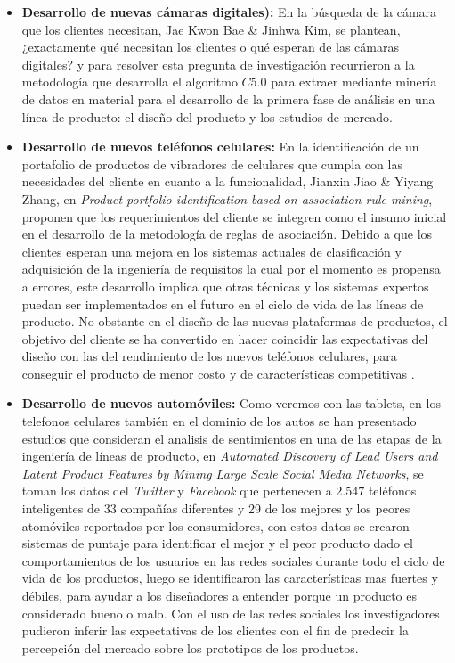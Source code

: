 \begin{itemize}
	
	\item  {\textbf{Desarrollo de nuevas cámaras digitales):}} 
	En la búsqueda de la cámara que los clientes necesitan,  Jae Kwon Bae \&  Jinhwa Kim,\cite{Bae2011} se plantean, ¿exactamente qué necesitan los clientes o qué esperan de las  cámaras digitales? y para resolver esta pregunta de investigación recurrieron a la metodología que desarrolla el algoritmo $C5.0$ para extraer mediante minería de datos en material para el desarrollo de la primera fase de análisis en una línea de producto: el diseño del producto y los estudios de mercado.
	
	\item  {\textbf{Desarrollo de nuevos teléfonos celulares:}}
	 En la identificación de un portafolio de productos de vibradores de celulares que cumpla con las necesidades del cliente en cuanto a la funcionalidad, Jianxin Jiao \& Yiyang Zhang, en \textit{Product portfolio identification based on association rule mining}\cite{Jiao2005}, proponen que los requerimientos del cliente se integren como el insumo inicial en el desarrollo de  la metodología de reglas de asociación. Debido a que los clientes esperan una mejora en los  sistemas actuales de clasificación y adquisición de la ingeniería de requisitos la cual por el momento es propensa a errores, este desarrollo implica que otras técnicas\cite{Somprasertsri2010} y los sistemas expertos puedan ser implementados en el futuro en el ciclo de vida de las líneas de producto. No obstante en el diseño de las nuevas plataformas de productos, el objetivo del cliente se ha convertido en hacer coincidir las expectativas del diseño con las del rendimiento de los nuevos teléfonos celulares, para conseguir el producto de menor costo y de características competitivas \cite{Tucker2008}. 
	 
	\item  {\textbf{Desarrollo de nuevos automóviles:}}
	Como veremos con las tablets, en los telefonos celulares también en el dominio de los autos se han presentado estudios que consideran el analisis de sentimientos en una de las etapas de la ingeniería de líneas de producto, en \textit{Automated Discovery of Lead Users and Latent Product Features by Mining Large Scale Social Media Networks}\cite{Tuarob2015},  se toman los datos del \textit{Twitter} y \textit{Facebook} que pertenecen a $2.547$ teléfonos inteligentes de 33 compañías diferentes y 29 de los mejores y los peores atomóviles reportados por los consumidores, con estos datos se crearon sistemas de puntaje para identificar el mejor y el peor producto dado el comportamientos de los usuarios en las redes sociales durante todo el ciclo de vida de los productos, luego se identificaron las características mas fuertes y débiles, para ayudar a los diseñadores a entender porque un producto es considerado bueno o malo. Con el uso de las redes sociales los investigadores pudieron inferir las expectativas de los clientes con el fin de predecir la percepción del mercado sobre los prototipos de los productos.
	

\end{itemize}
